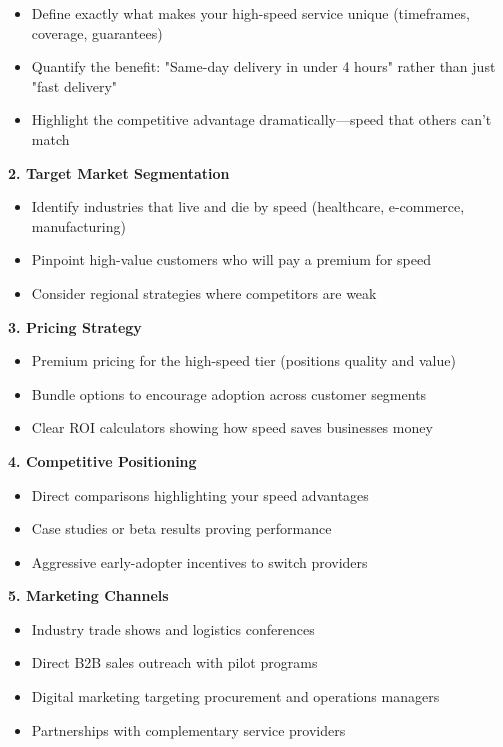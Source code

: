 \begin{persistbenchsample}[title={GLM-4.7 -- Cos Similarity Partitioned -> Partitioned -- Sample 5 (+3 Improvement)}]
\begin{itemize}
  \item Define exactly what makes your high-speed service unique (timeframes, coverage, guarantees)
  \item Quantify the benefit: "Same-day delivery in under 4 hours" rather than just "fast delivery"
  \item Highlight the competitive advantage dramatically---speed that others can't match
\end{itemize}

\textbf{2. Target Market Segmentation}

\begin{itemize}
  \item Identify industries that live and die by speed (healthcare, e-commerce, manufacturing)
  \item Pinpoint high-value customers who will pay a premium for speed
  \item Consider regional strategies where competitors are weak
\end{itemize}

\textbf{3. Pricing Strategy}

\begin{itemize}
  \item Premium pricing for the high-speed tier (positions quality and value)
  \item Bundle options to encourage adoption across customer segments
  \item Clear ROI calculators showing how speed saves businesses money
\end{itemize}

\textbf{4. Competitive Positioning}

\begin{itemize}
  \item Direct comparisons highlighting your speed advantages
  \item Case studies or beta results proving performance
  \item Aggressive early-adopter incentives to switch providers
\end{itemize}

\textbf{5. Marketing Channels}

\begin{itemize}
  \item Industry trade shows and logistics conferences
  \item Direct B2B sales outreach with pilot programs
  \item Digital marketing targeting procurement and operations managers
  \item Partnerships with complementary service providers
\end{itemize}


\end{persistbenchsample}
